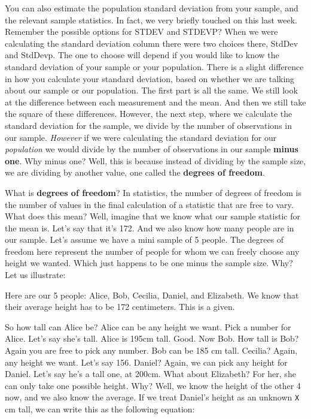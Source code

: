 \documentclass[
]{book}
\begin{document}
You can also estimate the population standard deviation from your sample, and the relevant sample statistics. In fact, we very briefly touched on this last week. Remember the possible options for STDEV and STDEVP? When we were calculating the standard deviation column there were two choices there, StdDev and StdDevp. The one to choose will depend if you would like to know the standard deviation of your sample or your population. There is a slight difference in how you calculate your standard deviation, based on whether we are talking about our sample or our population. The first part is all the same. We still look at the difference between each measurement and the mean. And then we still take the square of these differences. However, the next step, where we calculate the standard deviation for the sample, we divide by the number of observations in our sample. \emph{However} if we were calculating the standard deviation for our \emph{population} we would divide by the number of observations in our sample \textbf{minus one}. Why minus one? Well, this is because instead of dividing by the sample size, we are dividing by another value, one called the \textbf{degrees of freedom}.

What is \textbf{degrees of freedom}? In statistics, the number of degrees of freedom is the number of values in the final calculation of a statistic that are free to vary. What does this mean? Well, imagine that we know what our sample statistic for the mean is. Let's say that it's 172. And we also know how many people are in our sample. Let's assume we have a mini sample of 5 people. The degrees of freedom here represent the number of people for whom we can freely choose any height we wanted. Which just happens to be one minus the sample size. Why? Let us illustrate:

Here are our 5 people: Alice, Bob, Cecilia, Daniel, and Elizabeth. We know that their average height has to be 172 centimeters. This is a given.

So how tall can Alice be? Alice can be any height we want. Pick a number for Alice. Let's say she's tall. Alice is 195cm tall. Good. Now Bob. How tall is Bob? Again you are free to pick any number. Bob can be 185 cm tall. Cecilia? Again, any height we want. Let's say 156. Daniel? Again, we can pick any height for Daniel. Let's say he's a tall one, at 200cm. What about Elizabeth? For her, she can only take one possible height. Why? Well, we know the height of the other 4 now, and we also know the average. If we treat Daniel's height as an unknown \texttt{X} cm tall, we can write this as the following equation:
\end{document}
